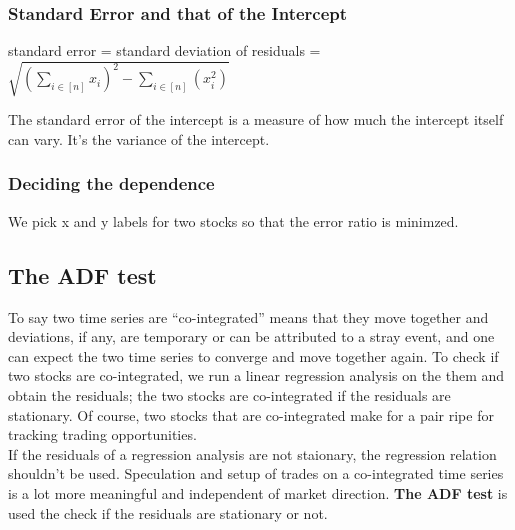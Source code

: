 \documentclass{article}
\begin{document}
\subsubsection{Standard Error and that of the Intercept}
\begin{center}
    standard error = standard deviation of residuals = $\sqrt{(\sum_{i\in [n]}{x_i})^2 - \sum_{i \in [n]}{(x_i^2)}}$
\end{center}
The standard error of the intercept is a measure of how much the intercept itself
can vary. It's the variance of the intercept.
\subsubsection{Deciding the dependence}
We pick x and y labels for two stocks so that the error ratio is minimzed.
\subsection{The ADF test}
To say two time series are ``co-integrated'' means that they move together and
deviations, if any, are temporary or can be attributed to a stray event, and
one can expect the two time series to converge and move together again.
To check if two stocks are co-integrated, we run a linear regression analysis on 
the them and obtain the residuals; the two stocks are co-integrated if the
residuals are stationary. Of course, two stocks that are co-integrated make for a
pair ripe for tracking trading opportunities.\\
If the residuals of a regression analysis are not staionary, the regression 
relation shouldn't be used. Speculation and setup of trades on a co-integrated
time series is a lot more meaningful and independent of market direction. 
\textbf{The ADF test} is used the check if the residuals are stationary or not.
\end{document}
